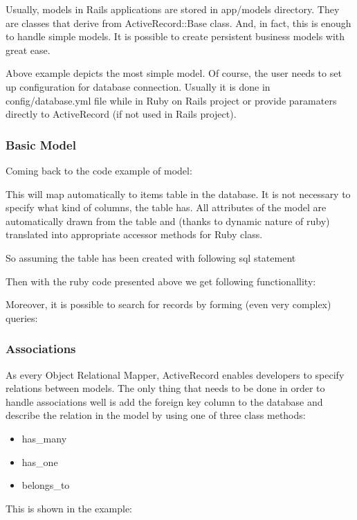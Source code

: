       Usually, models in Rails applications are stored in app/models directory. They are classes that
      derive from ActiveRecord::Base class. And, in fact, this is enough to handle simple models.
      It is possible to create persistent business models with great ease.

      

      Above example depicts the most simple model. Of course, the user needs to set up configuration
      for database connection. Usually it is done in config/database.yml file while in Ruby on Rails project
      or provide paramaters directly to ActiveRecord (if not used in Rails project).

      

      \subsubsection{Basic Model}
      Coming back to the code example of model:

      

      This will map automatically to items table in the database. It is not necessary to specify
      what kind of columns, the table has. All attributes of the model are automatically
      drawn from the table and (thanks to dynamic nature of ruby) translated into appropriate
      accessor methods for Ruby class.

      So assuming the table has been created with following sql statement

       

      Then with the ruby code presented above we get following functionallity:

       

      Moreover, it is possible to search for records by forming (even very complex) queries:

      

      \subsubsection{Associations}
      As every Object Relational Mapper, ActiveRecord enables developers to specify relations
      between models. The only thing that needs to be done in order to handle associations well
      is add the foreign key column to the database and describe the relation in the model by
      using one of three class methods:
        \begin{itemize}
          \item{has\_many}
          \item{has\_one}
          \item{belongs\_to}
        \end{itemize}
      This is shown in the example:

